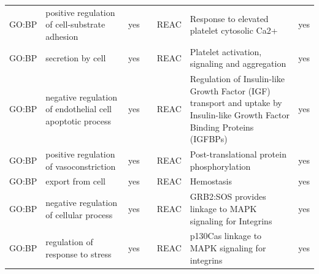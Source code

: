 \begin{longtable}{@{}lp{5cm}lllp{5cm}l@{}}
GO:BP           & positive regulation of cell-substrate adhesion                                                                                     & yes              &           & REAC            & Response to elevated platelet cytosolic Ca2+                                                                                                                           & yes              \\
GO:BP           & secretion by cell                                                                                                                  & yes              &           & REAC            & Platelet activation, signaling and aggregation                                                                                                                         & yes              \\
GO:BP           & negative regulation of endothelial cell apoptotic process                                                                          & yes              &           & REAC            & Regulation of Insulin-like Growth Factor (IGF) transport and uptake by Insulin-like Growth Factor Binding Proteins (IGFBPs) & yes              \\
GO:BP           & positive regulation of vasoconstriction                                                                                            & yes              &           & REAC            & Post-translational protein phosphorylation                                                                                                                             & yes              \\
GO:BP           & export from cell                                                                                                                   & yes              &           & REAC            & Hemostasis                                                                                                                                                             & yes              \\
GO:BP           & negative regulation of cellular process                                                                                            & yes              &           & REAC            & GRB2:SOS provides linkage to MAPK signaling for Integrins                                                                                                              & yes              \\
GO:BP           & regulation of response to stress                                                                                                   & yes              &           & REAC            & p130Cas linkage to MAPK signaling for integrins                                                                                                                        & yes              \\

\end{longtable}
